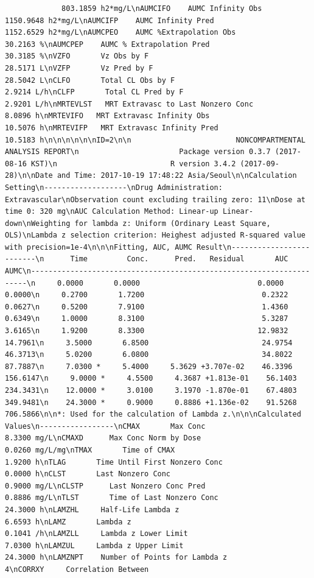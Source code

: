 \documentclass[]{krantz}
\theoremstyle{definition}
\theoremstyle{definition}
\theoremstyle{definition}
\theoremstyle{remark}
\begin{document}
\begin{verbatim}
             803.1859 h2*mg/L\nAUMCIFO    AUMC Infinity Obs                            1150.9648 h2*mg/L\nAUMCIFP    AUMC Infinity Pred                           1152.6529 h2*mg/L\nAUMCPEO    AUMC %Extrapolation Obs                        30.2163 %\nAUMCPEP    AUMC % Extrapolation Pred                      30.3185 %\nVZFO       Vz Obs by F                                    28.5171 L\nVZFP       Vz Pred by F                                   28.5042 L\nCLFO       Total CL Obs by F                               2.9214 L/h\nCLFP       Total CL Pred by F                              2.9201 L/h\nMRTEVLST   MRT Extravasc to Last Nonzero Conc              8.0896 h\nMRTEVIFO   MRT Extravasc Infinity Obs                     10.5076 h\nMRTEVIFP   MRT Extravasc Infinity Pred                    10.5183 h\n\n\n\n\n\nID=2\n\n                        NONCOMPARTMENTAL ANALYSIS REPORT\n                       Package version 0.3.7 (2017-08-16 KST)\n                          R version 3.4.2 (2017-09-28)\n\nDate and Time: 2017-10-19 17:48:22 Asia/Seoul\n\nCalculation Setting\n-------------------\nDrug Administration: Extravascular\nObservation count excluding trailing zero: 11\nDose at time 0: 320 mg\nAUC Calculation Method: Linear-up Linear-down\nWeighting for lambda z: Uniform (Ordinary Least Square, OLS)\nLambda z selection criterion: Heighest adjusted R-squared value with precision=1e-4\n\n\nFitting, AUC, AUMC Result\n-------------------------\n      Time         Conc.      Pred.   Residual       AUC       AUMC\n---------------------------------------------------------------------\n     0.0000       0.0000                           0.0000     0.0000\n     0.2700       1.7200                           0.2322     0.0627\n     0.5200       7.9100                           1.4360     0.6349\n     1.0000       8.3100                           5.3287     3.6165\n     1.9200       8.3300                          12.9832    14.7961\n     3.5000       6.8500                          24.9754    46.3713\n     5.0200       6.0800                          34.8022    87.7887\n     7.0300 *     5.4000     5.3629 +3.707e-02    46.3396   156.6147\n     9.0000 *     4.5500     4.3687 +1.813e-01    56.1403   234.3431\n    12.0000 *     3.0100     3.1970 -1.870e-01    67.4803   349.9481\n    24.3000 *     0.9000     0.8886 +1.136e-02    91.5268   706.5866\n\n*: Used for the calculation of Lambda z.\n\n\nCalculated Values\n-----------------\nCMAX       Max Conc                                        8.3300 mg/L\nCMAXD      Max Conc Norm by Dose                           0.0260 mg/L/mg\nTMAX       Time of CMAX                                    1.9200 h\nTLAG       Time Until First Nonzero Conc                   0.0000 h\nCLST       Last Nonzero Conc                               0.9000 mg/L\nCLSTP      Last Nonzero Conc Pred                          0.8886 mg/L\nTLST       Time of Last Nonzero Conc                      24.3000 h\nLAMZHL     Half-Life Lambda z                              6.6593 h\nLAMZ       Lambda z                                        0.1041 /h\nLAMZLL     Lambda z Lower Limit                            7.0300 h\nLAMZUL     Lambda z Upper Limit                           24.3000 h\nLAMZNPT    Number of Points for Lambda z                   4\nCORRXY     Correlation Between 
\end{verbatim}
\end{document}
